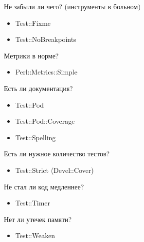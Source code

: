 \documentclass[aspectratio=169]{beamer}
\begin{document}
\begin{frame}{Не забыли ли чего? (инструменты в больном)}
\begin{itemize}
\item Test::Fixme
\item Test::NoBreakpoints
\end{itemize}
\end{frame}

\begin{frame}{Метрики в норме?}
\begin{itemize}
\item Perl::Metrics::Simple
\end{itemize}
\end{frame}

\begin{frame}{Есть ли документация?}
\begin{itemize}
\item Test::Pod
\item Test::Pod::Coverage
\item Test::Spelling
\end{itemize}
\end{frame}

\begin{frame}{Есть ли нужное количество тестов?}
\begin{itemize}
\item Test::Strict (Devel::Cover)
\end{itemize}
\end{frame}

\begin{frame}{Не стал ли код медленнее?}
\begin{itemize}
\item Test::Timer
\end{itemize}
\end{frame}

\begin{frame}{Нет ли утечек памяти?}
\begin{itemize}
\item Test::Weaken
\end{itemize}
\end{frame}
\end{document}
